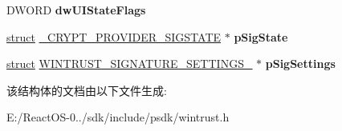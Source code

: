 \begin{DoxyCompactItemize}
D\+W\+O\+RD {\bfseries dw\+U\+I\+State\+Flags}
\item 
\mbox{\label{struct___c_r_y_p_t___p_r_o_v_i_d_e_r___d_a_t_a_a9f01f0709c59621063e6b7be14b0bc76}} 
\hyperlink{interfacestruct}{struct} \hyperlink{struct___c_r_y_p_t___p_r_o_v_i_d_e_r___s_i_g_s_t_a_t_e}{\+\_\+\+C\+R\+Y\+P\+T\+\_\+\+P\+R\+O\+V\+I\+D\+E\+R\+\_\+\+S\+I\+G\+S\+T\+A\+TE} $\ast$ {\bfseries p\+Sig\+State}
\item 
\mbox{\label{struct___c_r_y_p_t___p_r_o_v_i_d_e_r___d_a_t_a_a142a053f5f4ebb9cdc3980f8e4c4bc73}} 
\hyperlink{interfacestruct}{struct} \hyperlink{struct_w_i_n_t_r_u_s_t___s_i_g_n_a_t_u_r_e___s_e_t_t_i_n_g_s__}{W\+I\+N\+T\+R\+U\+S\+T\+\_\+\+S\+I\+G\+N\+A\+T\+U\+R\+E\+\_\+\+S\+E\+T\+T\+I\+N\+G\+S\+\_\+} $\ast$ {\bfseries p\+Sig\+Settings}
\end{DoxyCompactItemize}


该结构体的文档由以下文件生成\+:\begin{DoxyCompactItemize}
\item 
E\+:/\+React\+O\+S-\/0../sdk/include/psdk/wintrust.\+h\end{DoxyCompactItemize}
